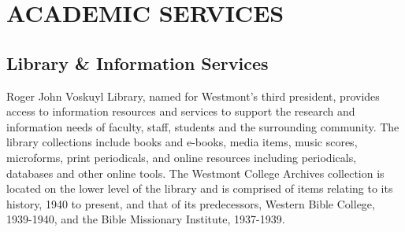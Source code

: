 

\section{ACADEMIC SERVICES}
	\subsection{Library \& Information Services}
		Roger John Voskuyl Library, named for Westmont's third president, provides access to information resources and services to support the research and information needs of faculty, staff, students and the surrounding community.  The library collections include books and e-books, media items, music scores, microforms, print periodicals, and online resources including periodicals, databases and other online tools.  The Westmont College Archives collection is located on the lower level of the library and is comprised of items relating to its history, 1940 to present, and that of its predecessors, Western Bible College, 1939-1940, and the Bible Missionary Institute, 1937-1939.
